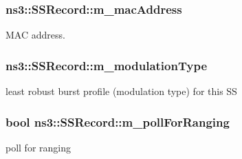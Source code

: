 \subsubsection[{\texorpdfstring{m\+\_\+mac\+Address}{m_macAddress}}]{ ns3\+::\+S\+S\+Record\+::m\+\_\+mac\+Address\hspace{0.3cm}{\ttfamily [private]}}\hypertarget{classns3_1_1SSRecord_a1eb3631f2852437bcbae46dab572efef}{}\label{classns3_1_1SSRecord_a1eb3631f2852437bcbae46dab572efef}


M\+AC address. 

\subsubsection[{\texorpdfstring{m\+\_\+modulation\+Type}{m_modulationType}}]{ ns3\+::\+S\+S\+Record\+::m\+\_\+modulation\+Type\hspace{0.3cm}{\ttfamily [private]}}\hypertarget{classns3_1_1SSRecord_aa212c1ab625a302277d92bbed0fcd577}{}\label{classns3_1_1SSRecord_aa212c1ab625a302277d92bbed0fcd577}


least robust burst profile (modulation type) for this SS 

\subsubsection[{\texorpdfstring{m\+\_\+poll\+For\+Ranging}{m_pollForRanging}}]{\setlength{\rightskip}{0pt plus 5cm}bool ns3\+::\+S\+S\+Record\+::m\+\_\+poll\+For\+Ranging\hspace{0.3cm}{\ttfamily [private]}}\hypertarget{classns3_1_1SSRecord_a83ea79b98a2e1b31399e3bdb9f85c3e6}{}\label{classns3_1_1SSRecord_a83ea79b98a2e1b31399e3bdb9f85c3e6}


poll for ranging 

